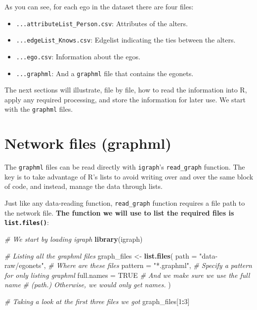 \documentclass[
]{book}
\newenvironment{Shaded}{\begin{snugshade}}{\end{snugshade}}
\newcommand{\AttributeTok}[1]{\textcolor[rgb]{0.13,0.29,0.53}{#1}}
\newcommand{\CommentTok}[1]{\textcolor[rgb]{0.56,0.35,0.01}{\textit{#1}}}
\newcommand{\ConstantTok}[1]{\textcolor[rgb]{0.56,0.35,0.01}{#1}}
\newcommand{\DecValTok}[1]{\textcolor[rgb]{0.00,0.00,0.81}{#1}}
\newcommand{\FunctionTok}[1]{\textcolor[rgb]{0.13,0.29,0.53}{\textbf{#1}}}
\newcommand{\NormalTok}[1]{#1}
\newcommand{\OtherTok}[1]{\textcolor[rgb]{0.56,0.35,0.01}{#1}}
\newcommand{\SpecialCharTok}[1]{\textcolor[rgb]{0.81,0.36,0.00}{\textbf{#1}}}
\newcommand{\StringTok}[1]{\textcolor[rgb]{0.31,0.60,0.02}{#1}}
\begin{document}
As you can see, for each ego in the dataset there are four files:

\begin{itemize}
\item
  \texttt{...attributeList\_Person.csv}: Attributes of the alters.
\item
  \texttt{...edgeList\_Knows.csv}: Edgelist indicating the ties between the alters.
\item
  \texttt{...ego.csv}: Information about the egos.
\item
  \texttt{...graphml}: And a \texttt{graphml} file that contains the egonets.
\end{itemize}

The next sections will illustrate, file by file, how to read the information into R, apply any required processing, and store the information for later use. We start with the \texttt{graphml} files.

\hypertarget{network-files-graphml}{%
\section{Network files (graphml)}\label{network-files-graphml}}

The \texttt{graphml} files can be read directly with \texttt{igraph}'s \texttt{read\_graph} function. The key is to take advantage of R's lists to avoid writing over and over the same block of code, and instead, manage the data through lists.

Just like any data-reading function, \texttt{read\_graph} function requires a file path to the network file. \textbf{The function we will use to list the required files is \texttt{list.files()}}:

\begin{Shaded}
\begin{Highlighting}[]
\CommentTok{\# We start by loading igraph}
\FunctionTok{library}\NormalTok{(igraph)}

\CommentTok{\# Listing all the graphml files}
\NormalTok{graph\_files }\OtherTok{\textless{}{-}} \FunctionTok{list.files}\NormalTok{(}
  \AttributeTok{path       =} \StringTok{"data{-}raw/egonets"}\NormalTok{, }\CommentTok{\# Where are these files}
  \AttributeTok{pattern    =} \StringTok{"*.graphml"}\NormalTok{,        }\CommentTok{\# Specify a pattern for only listing graphml}
  \AttributeTok{full.names =} \ConstantTok{TRUE}                \CommentTok{\# And we make sure we use the full name}
                                   \CommentTok{\# (path.) Otherwise, we would only get names.}
\NormalTok{  )}

\CommentTok{\# Taking a look at the first three files we got}
\NormalTok{graph\_files[}\DecValTok{1}\SpecialCharTok{:}\DecValTok{3}\NormalTok{]}
\end{Highlighting}
\end{Shaded}
\end{document}
